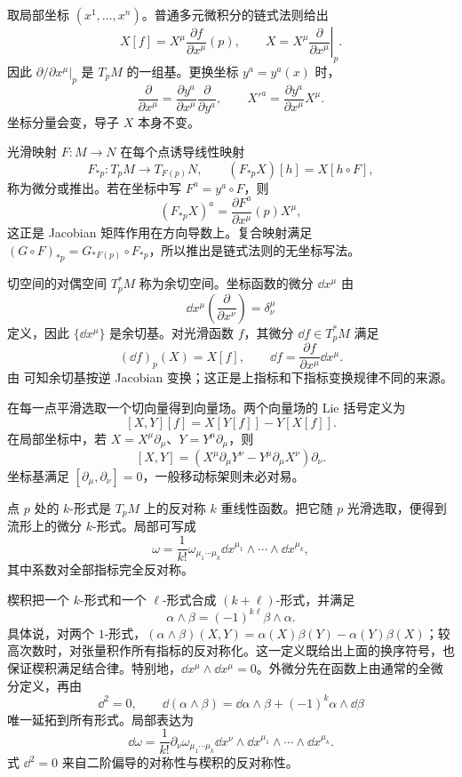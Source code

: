 取局部坐标 \((x^1,\ldots,x^n)\)。普通多元微积分的链式法则给出
\[
X[f]=X^\mu\frac{\partial f}{\partial x^\mu}(p),
\qquad
X=X^\mu\left.\frac{\partial}{\partial x^\mu}\right|_p.
\]
因此 \(\partial/\partial x^\mu|_p\) 是 \(T_pM\) 的一组基。更换坐标 \(y^a=y^a(x)\) 时，
\begin{equation}
\frac{\partial}{\partial x^\mu}
=\frac{\partial y^a}{\partial x^\mu}
\frac{\partial}{\partial y^a},
\qquad
X'^a=\frac{\partial y^a}{\partial x^\mu}X^\mu.
\label{eq:tangent-coordinate-transform-primer}
\end{equation}
坐标分量会变，导子 \(X\) 本身不变。

光滑映射 \(F:M\to N\) 在每个点诱导线性映射
\[
F_{*p}:T_pM\longrightarrow T_{F(p)}N,
\qquad
(F_{*p}X)[h]=X[h\circ F],
\]
称为微分或推出。若在坐标中写 \(F^a= y^a\circ F\)，则
\[
(F_{*p}X)^a=\frac{\partial F^a}{\partial x^\mu}(p)X^\mu,
\]
这正是 Jacobian 矩阵作用在方向导数上。复合映射满足
\((G\circ F)_{*p}=G_{*F(p)}\circ F_{*p}\)，所以推出是链式法则的无坐标写法。

切空间的对偶空间 \(T_p^*M\) 称为余切空间。坐标函数的微分 \(\dd x^\mu\) 由
\[
\dd x^\mu\!\left(\frac{\partial}{\partial x^\nu}\right)
=\delta^\mu_{\nu}
\]
定义，因此 \(\{\dd x^\mu\}\) 是余切基。对光滑函数 \(f\)，其微分 \(\dd f\in T_p^*M\) 满足
\[
(\dd f)_p(X)=X[f],
\qquad
\dd f=\frac{\partial f}{\partial x^\mu}\dd x^\mu.
\]
由  可知余切基按逆 Jacobian 变换；这正是上指标和下指标变换规律不同的来源。

在每一点平滑选取一个切向量得到向量场。两个向量场的 Lie 括号定义为
\[
[X,Y][f]=X[Y[f]]-Y[X[f]].
\]
在局部坐标中，若 \(X=X^\mu\partial_\mu\)、\(Y=Y^\mu\partial_\mu\)，则
\[
[X,Y]
=\left(X^\mu\partial_\mu Y^\nu-Y^\mu\partial_\mu X^\nu\right)\partial_\nu.
\]
坐标基满足 \([\partial_\mu,\partial_\nu]=0\)，一般移动标架则未必对易。

\begin{definition}[微分形式]
点 \(p\) 处的 \(k\)-形式是 \(T_pM\) 上的反对称 \(k\) 重线性函数。把它随 \(p\) 光滑选取，便得到流形上的微分 \(k\)-形式。局部可写成
\[
\omega=\frac1{k!}\omega_{\mu_1\cdots\mu_k}
\dd x^{\mu_1}\wedge\cdots\wedge\dd x^{\mu_k},
\]
其中系数对全部指标完全反对称。
\end{definition}

楔积把一个 \(k\)-形式和一个 \(\ell\)-形式合成 \((k+\ell)\)-形式，并满足
\[
\alpha\wedge\beta=(-1)^{k\ell}\beta\wedge\alpha.
\]
具体说，对两个 $1$-形式，$(\alpha\wedge\beta)(X,Y)=\alpha(X)\beta(Y)-\alpha(Y)\beta(X)$；较高次数时，对张量积作所有指标的反对称化。这一定义既给出上面的换序符号，也保证楔积满足结合律。特别地，\(\dd x^\mu\wedge\dd x^\mu=0\)。外微分先在函数上由通常的全微分定义，再由
\[
\dd^2=0,
\qquad
\dd(\alpha\wedge\beta)
=\dd\alpha\wedge\beta+(-1)^k\alpha\wedge\dd\beta
\]
唯一延拓到所有形式。局部表达为
\[
\dd\omega
=\frac1{k!}\partial_\nu\omega_{\mu_1\cdots\mu_k}
\dd x^\nu\wedge\dd x^{\mu_1}\wedge\cdots\wedge\dd x^{\mu_k}.
\]
式 \(\dd^2=0\) 来自二阶偏导的对称性与楔积的反对称性。

